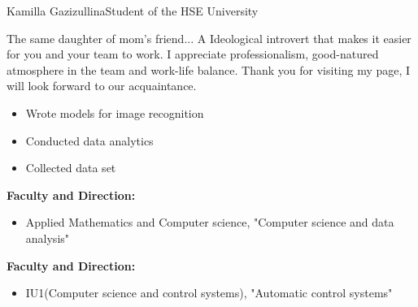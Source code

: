\documentclass{article}
\begin{document}
\begin{cv}{Kamilla Gazizullina}{Student of the HSE University}


The same daughter of mom's friend... A Ideological introvert that makes it easier for you and your team to work. I appreciate professionalism, good-natured atmosphere in the team and work-life balance. Thank you for visiting my page, I will look forward to our acquaintance.


\begin{cvevent}[2022][2022]
    \begin{itemize}
        \item Wrote models for image recognition
        \item Conducted data analytics
        \item Collected data set
    \end{itemize}
\end{cvevent}


\begin{cvevent}[2026][2022]
    \textbf{Faculty and Direction:}
    \begin{itemize}
        \item  Applied Mathematics and Computer science, "Computer science and data analysis"
    \end{itemize}
\end{cvevent}

\begin{cvevent}[2022][2019]
    \textbf{Faculty and Direction:}
    \begin{itemize}
        \item  IU1(Computer science and control systems), "Automatic control systems"
    \end{itemize}
\end{cvevent}


\cvsidebar %


\end{cv}
\end{document}
